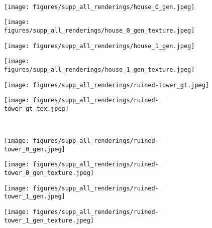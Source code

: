 \begin{figure*}[!h]
\begin{subfigure}{.16\linewidth}
    \end{subfigure}
    \unskip\ \vrule\ 
    \begin{subfigure}{.16\linewidth}
        \centering
        \texttt{[image: figures/supp\_all\_renderings/house\_0\_gen.jpeg]}
    \end{subfigure}
    \begin{subfigure}{.16\linewidth}
        \centering
        \texttt{[image: figures/supp\_all\_renderings/house\_0\_gen\_texture.jpeg]}
    \end{subfigure}
    \begin{subfigure}{.16\linewidth}
        \centering
        \texttt{[image: figures/supp\_all\_renderings/house\_1\_gen.jpeg]}
    \end{subfigure}
    \begin{subfigure}{.16\linewidth}
        \centering
        \texttt{[image: figures/supp\_all\_renderings/house\_1\_gen\_texture.jpeg]}
    \end{subfigure}
    \begin{subfigure}{.16\linewidth}
        \centering
        \texttt{[image: figures/supp\_all\_renderings/ruined-tower\_gt.jpeg]}
    \end{subfigure}
    \begin{subfigure}{.16\linewidth}
        \centering
        \texttt{[image: figures/supp\_all\_renderings/ruined-tower\_gt\_tex.jpeg]}
    \end{subfigure}
    \unskip\ \vrule\ 
    \begin{subfigure}{.16\linewidth}
        \centering
        \texttt{[image: figures/supp\_all\_renderings/ruined-tower\_0\_gen.jpeg]}
    \end{subfigure}
    \begin{subfigure}{.16\linewidth}
        \centering
        \texttt{[image: figures/supp\_all\_renderings/ruined-tower\_0\_gen\_texture.jpeg]}
    \end{subfigure}
    \begin{subfigure}{.16\linewidth}
        \centering
        \texttt{[image: figures/supp\_all\_renderings/ruined-tower\_1\_gen.jpeg]}
    \end{subfigure}
    \begin{subfigure}{.16\linewidth}
        \centering
        \texttt{[image: figures/supp\_all\_renderings/ruined-tower\_1\_gen\_texture.jpeg]}

\end{subfigure}
\end{figure*}

